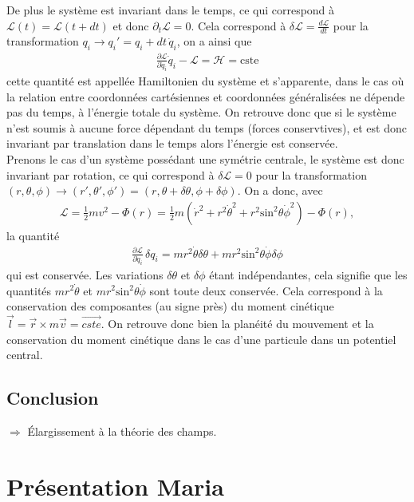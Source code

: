 \documentclass[12pt,prb,aps,epsf]{report}
\begin{document}
De plus le système est invariant dans le temps, ce qui correspond à $\mathcal{L}(t) = \mathcal{L}(t+dt)$ et donc $\partial_t\mathcal{L}=0$. Cela correspond à $\delta \mathcal{L} = \frac{d\mathcal{L}}{dt}$ pour la transformation $q_i\rightarrow q_i'=q_i +dt\, \dot{q}_i$, on a ainsi que 
\begin{eqnarray}
\frac{\partial \mathcal{L}}{\partial  \dot{q}_i}\dot{q}_i - \mathcal{L} = \mathcal{H}= \mathrm{cste}
\end{eqnarray}
cette quantité est appellée Hamiltonien du système et s'apparente, dans le cas où la relation entre coordonnées cartésiennes et coordonnées généralisées ne dépende pas du temps, à l'énergie totale du système. On retrouve donc que si le système n'est soumis à aucune force dépendant du temps (forces conservtives), et est donc invariant par translation dans le temps alors l'énergie est conservée.\\

Prenons le cas d'un système possédant une symétrie centrale, le système est donc invariant par rotation, ce qui correspond à $\delta \mathcal{L} = 0$ pour la transformation $(r,\theta,\phi) \rightarrow (r',\theta',\phi')= (r,\theta+\delta\theta,\phi+\delta\phi)$. On a donc, avec 
\begin{eqnarray}
\mathcal{L} = \frac{1}{2} mv^2 - \Phi(r) = \frac{1}{2}m(\dot{r}^2+r^2\dot{\theta}^2+r^2\mathrm{sin}^2\theta \dot{\phi}^2) - \Phi(r),
\end{eqnarray}
la quantité
\begin{eqnarray}
\frac{\partial \mathcal{L}}{\partial  \dot{q}_i} \,\delta q_i =  mr^2\dot{\theta}\delta\theta + mr^2\mathrm{sin}^2\theta \dot{\phi}\delta\phi
\end{eqnarray}
qui est conservée. Les variations $\delta\theta$ et $\delta\phi$ étant indépendantes, cela signifie que les quantités $mr^2\dot{\theta}$ et $mr^2\mathrm{sin}^2\theta \dot{\phi}$ sont toute deux conservée.  Cela correspond à la conservation des composantes (au signe près) du moment cinétique $\vec{l} = \vec{r}\times m\vec{v} = \vec{cste}$. On retrouve donc bien la planéité du mouvement et la conservation du moment cinétique dans le cas d'une particule dans un potentiel central.
\section{Conclusion}
$\Rightarrow$ Élargissement à la théorie des champs.




\chapter{Présentation Maria}
\end{document}
